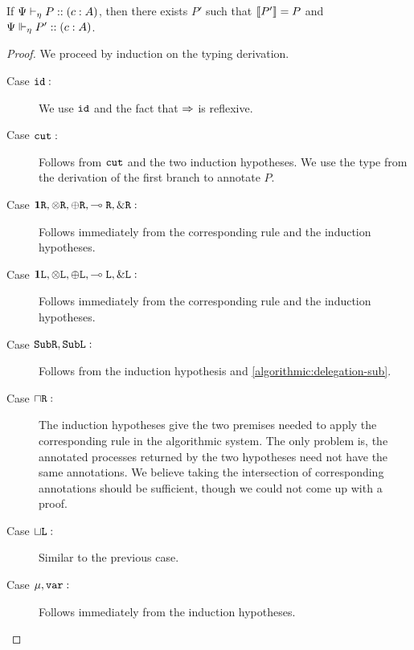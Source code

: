 \begin{theorem}
  If ${\Psi} \vdash_{\eta} P :: (c : A)$, then there exists $P'$ such that $\llbracket P'\rrbracket = P$ and ${\Psi} \Vdash_{\eta} P' :: (c : A)$.
\end{theorem}
\begin{proof}
  We proceed by induction on the typing derivation.
  \begin{description}
    \item[Case $\texttt{id} :$] We use $\texttt{id}$ and the fact that $\mathrel\Rightarrow$ is reflexive.
    \item[Case $\texttt{cut} :$] Follows from $\texttt{cut}$ and the two induction hypotheses. We use the type from the derivation of the first branch to annotate $P$.

    \item[Case $\mathbf{1}\texttt{R}, \otimes\texttt{R}, \oplus\texttt{R}, \multimap\texttt{R}, \&\texttt{R} :$] Follows immediately from the corresponding rule and the induction hypotheses.
    \item[Case $\mathbf{1}\texttt{L}, \otimes\texttt{L}, \oplus\texttt{L}, \multimap\texttt{L}, \&\texttt{L} :$] Follows immediately from the corresponding rule and the induction hypotheses.

    \item[Case $\texttt{Sub}\texttt{R}, \texttt{Sub}\texttt{L} :$] Follows from the induction hypothesis and \cref{algorithmic:delegation-sub}.

    \item[Case $\mathbin{\sqcap}\texttt{R} :$] The induction hypotheses give the two premises needed to apply the corresponding rule in the algorithmic system. The only problem is, the annotated processes returned by the two hypotheses need not have the same annotations. We believe taking the intersection of corresponding annotations should be sufficient, though we could not come up with a proof. 
    \item[Case $\mathbin{\sqcup}\texttt{L} :$] Similar to the previous case. 

    \item[Case $\mu, \texttt{var} :$] Follows immediately from the induction hypotheses.
  \end{description}
\end{proof}


